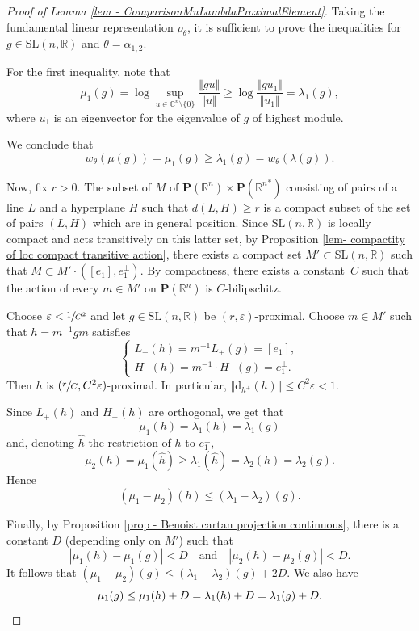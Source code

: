 \documentclass[JEP,XML,SOM,Unicode,NoEqCountersInSection,NoFloatCountersInSection,published]{cedram}
\newcommand{\quand}{\quad\text{and}\quad}
\theoremstyle{definition}
\newcommand{\proj}{\mathbf{P}}
\newcommand{\R}{\mathbb{R}}
\newcommand{\C}{\mathbb{C}}
\newcommand{\SL}{\mathrm{SL}}
\let\epsilon\varepsilon
\begin{document}
\begin{proof}[Proof of Lemma \ref{lem - ComparisonMuLambdaProximalElement}]
Taking the fundamental linear representation $\rho_\theta$, it is sufficient to prove the inequalities for $g\in \SL(n,\R)$ and $\theta = \alpha_{1,2}$.

For the first inequality, note that
\[
\mu_1(g) = \log \sup_{u\in \C^n\setminus \{0\}} \frac{\Vert g u \Vert}{\Vert u \Vert} \geq \log \frac{\Vert g u_1 \Vert}{\Vert u_1 \Vert} = \lambda_1(g),
\]
where $u_1$ is an eigenvector for the eigenvalue of $g$ of highest module.

We conclude that
\[
w_\theta(\mu(g)) = \mu_1(g) \geq \lambda_1(g) = w_\theta(\lambda(g)).
\]

Now, fix $r>0$. The subset of $M$ of $\proj(\R^n)\times \proj({\R^n}^*)$ consisting of pairs of a line $L$ and a hyperplane $H$ such that $d(L , H) \geq r$ is a compact subset of the set of pairs $(L,H)$ which are in general position. Since $\SL(n, \R) $ is locally compact and acts transitively on this latter set, by Proposition \ref{lem- compactity of loc compact transitive action}, there exists a compact set $M'\subset \SL(n,\R)$ such that $M \subset M'\cdot ([e_1], e_1^\perp)$. By compactness, there exists a constant~$C$ such that the action of every $m\in M'$ on $\proj(\R^n)$ is $C$-bilipschitz.

Choose $\epsilon < \sfrac{1}{C^2}$ and let $g\in \SL(n,\R)$ be $(r,\epsilon)$-proximal. Choose $m\in M'$ such that $h=m^{-1}gm$ satisfies
\[\begin{cases}
L_+(h) = m^{-1} L_+(g) = [e_1],\\
H_-(h) = m^{-1} \cdot H_-(g) = e_1^\perp.
\end{cases}
\]
Then $h$ is $(\sfrac{r}{C}, C^2 \epsilon)$-proximal. In particular,
$\Vert \mathrm d_{h^+}(h) \Vert \leq C^2 \epsilon < 1$.

Since $L_+(h)$ and $H_-(h)$ are orthogonal, we get that \[\mu_1 (h)= \lambda_1(h) = \lambda_1(g)\] and, denoting $\hat h$ the restriction of $h$ to $e_1^\perp$,
\[\mu_2(h) = \mu_1(\hat h) \geq \lambda_1(\hat h) = \lambda_2(h) = \lambda_2(g).\]
Hence
\[(\mu_1-\mu_2)(h) \leq (\lambda_1-\lambda_2)(g).\]

Finally, by Proposition \ref{prop - Benoist cartan projection continuous}, there is a constant $D$ (depending only on $M'$) such that
\[|\mu_1(h) - \mu_1(g)| < D\quand
|\mu_2(h) - \mu_2(g)| < D.\]
It follows that $(\mu_1-\mu_2)(g)\leq (\lambda_1-\lambda_2)(g)+2D$. We also have \[\mu_1(g) \leq \mu_1(h)+D=\lambda_1(h)+D=\lambda_1(g)+D.\qedhere\]
\end{proof}
\end{document}
